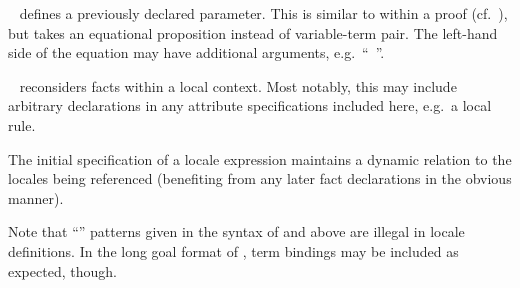 \begin{isabellebody}
\begin{isamarkuptext}
\begin{description}
\begin{description}
  \item \hyperlink{element.defines}{\mbox{}}~ defines a previously
  declared parameter.  This is similar to \hyperlink{command.def}{\mbox{}} within a
  proof (cf.\ ), but \hyperlink{element.defines}{\mbox{}}
  takes an equational proposition instead of variable-term pair.  The
  left-hand side of the equation may have additional arguments, e.g.\
  ``\hyperlink{element.defines}{\mbox{}}~''.

  \item \hyperlink{element.notes}{\mbox{}}~
  reconsiders facts within a local context.  Most notably, this may
  include arbitrary declarations in any attribute specifications
  included here, e.g.\ a local \hyperlink{attribute.simp}{\mbox{}} rule.

  The initial  specification of a locale expression
  maintains a dynamic relation to the locales being referenced
  (benefiting from any later fact declarations in the obvious manner).

  \end{description}
  
  Note that ``'' patterns given
  in the syntax of \hyperlink{element.assumes}{\mbox{\isa{\isakeyword{assumes}}}} and \hyperlink{element.defines}{\mbox{\isa{\isakeyword{defines}}}} above
  are illegal in locale definitions.  In the long goal format of
  \secref{sec:goals}, term bindings may be included as expected,
  though.
  

\end{description}
\end{isamarkuptext}
\end{isabellebody}
